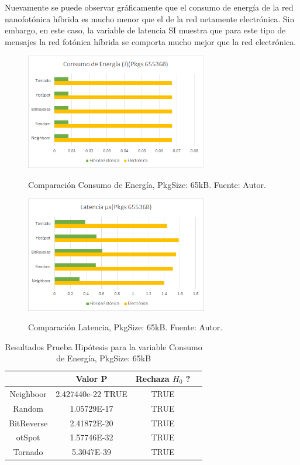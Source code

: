 \documentclass{IEEEtran}
\begin{document}
Nuevamente se puede observar gráficamente que el consumo de energía de la red
nanofotónica híbrida es mucho menor que el de la red netamente electrónica.
Sin embargo, en este caso, la variable de latencia SI muestra que 
para este tipo de mensajes la red fotónica híbrida se comporta mucho mejor 
que la red electrónica.

\begin{figure}[]
\caption{Comparación Consumo de Energía, PkgSize: 65kB. Fuente: Autor.}
\centering
\includegraphics[width=8cm,natwidth=483,natheight=306]{figs/E65k.png}
\label{fig:e65k}
\end{figure} 

\begin{figure}[]
\caption{Comparación Latencia, PkgSize: 65kB. Fuente: Autor.}
\centering
\includegraphics[width=8cm,natwidth=483,natheight=306]{figs/L65k.png}
\label{fig:l65k}
\end{figure} 

\begin{table}[]
\centering
\begin{tabular}{|c|c|c|c|}
\hline
&Valor P&Rechaza $H_0$ ?\\
\hline
Neighboor&2.427440e-22 TRUE&TRUE\\
Random&1.05729E-17&TRUE\\
BitReverse&2.41872E-20&TRUE\\
otSpot&1.57746E-32&TRUE\\
Tornado&5.3047E-39&TRUE\\
\hline
\end{tabular}
\caption{Resultados Prueba Hipótesis para la variable Consumo de Energía, PkgSize: 65kB}
\label{tb:ettest65k}
\end{table}
\end{document}
